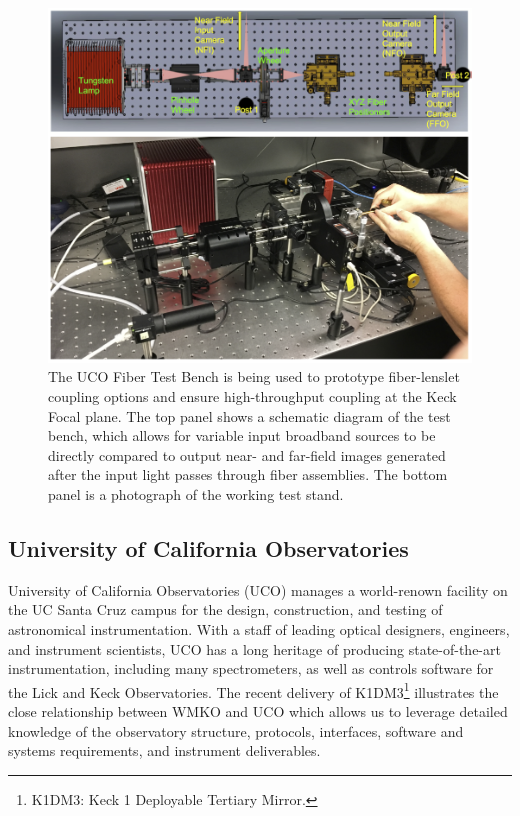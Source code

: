 \documentclass[oneside,11pt]{amsart}
\begin{document}
\begin{figure}[h!]
 \vskip -0.1in
 \includegraphics[width=\textwidth]{fig_test_bench.png}
 \caption{\small The UCO Fiber Test Bench is being used to prototype fiber-lenslet coupling options and ensure high-throughput coupling at the Keck Focal plane.  The top panel shows a schematic diagram of the test bench, which allows for variable input broadband sources to be directly compared to output near- and far-field images generated after the input light passes through fiber assemblies.  The bottom panel is a photograph of the working test stand.   }\label{fig:testbench}
\end{figure}

\subsection{University of California Observatories}

University of California Observatories (UCO) manages a world-renown facility on the UC Santa Cruz campus for the
design, construction, and testing of astronomical instrumentation.  With a staff of leading optical designers,
engineers, and instrument scientists, UCO has a long heritage of producing state-of-the-art instrumentation, including
many spectrometers, as well as controls software for the Lick and Keck Observatories.  The recent delivery of K1DM3\footnote{K1DM3: Keck 1 Deployable Tertiary Mirror.} illustrates the close relationship between WMKO and UCO which allows us to leverage detailed knowledge of the observatory structure, protocols, interfaces, software and systems requirements, and instrument deliverables.
\end{document}
